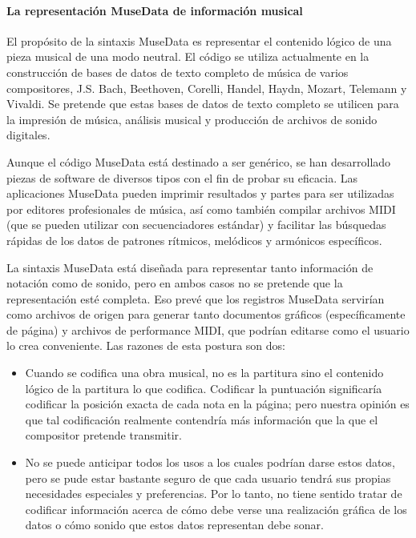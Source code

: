 \documentclass[]{article}
\let\oldparagraph\paragraph
\renewcommand{\paragraph}[1]{\oldparagraph{#1}\mbox{}}
\begin{document}
\hypertarget{la-representaciuxf3n-musedata-de-informaciuxf3n-musical}{%
\paragraph{La representación MuseData de información
musical}\label{la-representaciuxf3n-musedata-de-informaciuxf3n-musical}}

El propósito de la sintaxis MuseData es representar el contenido lógico
de una pieza musical de una modo neutral. El código se utiliza
actualmente en la construcción de bases de datos de texto completo de
música de varios compositores, J.S. Bach, Beethoven, Corelli, Handel,
Haydn, Mozart, Telemann y Vivaldi. Se pretende que estas bases de datos
de texto completo se utilicen para la impresión de música, análisis
musical y producción de archivos de sonido digitales.

Aunque el código MuseData está destinado a ser genérico, se han
desarrollado piezas de software de diversos tipos con el fin de probar
su eficacia. Las aplicaciones MuseData pueden imprimir resultados y
partes para ser utilizadas por editores profesionales de música, así
como también compilar archivos MIDI (que se pueden utilizar con
secuenciadores estándar) y facilitar las búsquedas rápidas de los datos
de patrones rítmicos, melódicos y armónicos específicos.

La sintaxis MuseData está diseñada para representar tanto información de
notación como de sonido, pero en ambos casos no se pretende que la
representación esté completa. Eso prevé que los registros MuseData
servirían como archivos de origen para generar tanto documentos gráficos
(específicamente de página) y archivos de performance MIDI, que podrían
editarse como el usuario lo crea conveniente. Las razones de esta
postura son dos:

\begin{itemize}
\item
  Cuando se codifica una obra musical, no es la partitura sino el
  contenido lógico de la partitura lo que codifica. Codificar la
  puntuación significaría codificar la posición exacta de cada nota en
  la página; pero nuestra opinión es que tal codificación realmente
  contendría más información que la que el compositor pretende
  transmitir.
\item
  No se puede anticipar todos los usos a los cuales podrían darse estos
  datos, pero se pude estar bastante seguro de que cada usuario tendrá
  sus propias necesidades especiales y preferencias. Por lo tanto, no
  tiene sentido tratar de codificar información acerca de cómo debe
  verse una realización gráfica de los datos o cómo sonido que estos
  datos representan debe sonar.
\end{itemize}
\end{document}
